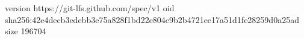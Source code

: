 version https://git-lfs.github.com/spec/v1
oid sha256:42e4decb3edebb3e75a828f1bd22e804c9b2b4721ee17a51d1fe28259d0a25ad
size 196704
